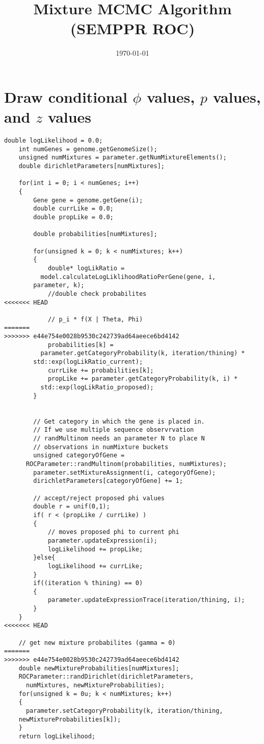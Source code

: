\documentclass[11pt]{article}
\begin{document}
  \title{Mixture MCMC Algorithm (SEMPPR ROC)}
  \date{\today}
  \maketitle
  
  \section{Draw conditional $\phi$ values, $p$ values, and $z$ values}
  
  \begin{lstlisting}[frame=single]
    double logLikelihood = 0.0;
    int numGenes = genome.getGenomeSize();
    unsigned numMixtures = parameter.getNumMixtureElements();
    double dirichletParameters[numMixtures];
    
    for(int i = 0; i < numGenes; i++)
    {
        Gene gene = genome.getGene(i);
        double currLike = 0.0;
        double propLike = 0.0;

        double probabilities[numMixtures];

        for(unsigned k = 0; k < numMixtures; k++)
        {
            double* logLikRatio = 
	      model.calculateLogLiklihoodRatioPerGene(gene, i, 
		parameter, k);
            //double check probabilites
<<<<<<< HEAD
            
            // p_i * f(X | Theta, Phi)
=======
>>>>>>> e44e754e0028b9530c242739ad64aeece6bd4142
            probabilities[k] = 
	      parameter.getCategoryProbability(k, iteration/thining) * 
		std::exp(logLikRatio_current);
            currLike += probabilities[k];
            propLike += parameter.getCategoryProbability(k, i) * 
	      std::exp(logLikRatio_proposed);
        }


        // Get category in which the gene is placed in.
        // If we use multiple sequence observrvation 
        // randMultinom needs an parameter N to place N 
        // observations in numMixture buckets
        unsigned categoryOfGene = 
	  ROCParameter::randMultinom(probabilities, numMixtures);
        parameter.setMixtureAssignment(i, categoryOfGene);
        dirichletParameters[categoryOfGene] += 1;

        // accept/reject proposed phi values
        double r = unif(0,1);
        if( r < (propLike / currLike) )
        {
            // moves proposed phi to current phi
            parameter.updateExpression(i);
            logLikelihood += propLike;
        }else{
            logLikelihood += currLike;
        }
        if((iteration % thining) == 0)
        {
            parameter.updateExpressionTrace(iteration/thining, i);
        }
    }
<<<<<<< HEAD
    
    // get new mixture probabilites (gamma = 0)
=======
>>>>>>> e44e754e0028b9530c242739ad64aeece6bd4142
    double newMixtureProbabilities[numMixtures];
    ROCParameter::randDirichlet(dirichletParameters, 
      numMixtures, newMixtureProbabilities);
    for(unsigned k = 0u; k < numMixtures; k++)
    {
      parameter.setCategoryProbability(k, iteration/thining, 
	newMixtureProbabilities[k]);
    }
    return logLikelihood;
  \end{lstlisting}
\end{document}
